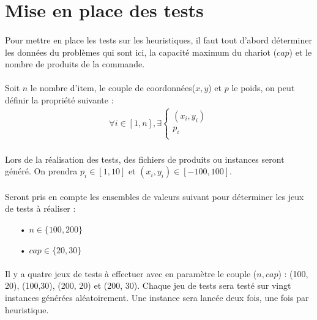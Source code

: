 \documentclass[twoside,UTF8]{EPURapport}
\begin{document}
\section{Mise en place des tests}

\paragraph{}
Pour mettre en place les tests sur les heuristiques, il faut tout d'abord déterminer les données du problèmes qui sont ici, la capacité maximum du chariot ($cap$) et le nombre de produits de la commande.

\paragraph{}
Soit $n$ le nombre d'item, le couple de coordonnées($x,y$) et $p$ le poids, on peut définir la propriété suivante : 
\begin{align}
\forall i\in [1,n], \exists
\left\{
  \begin{array}{rcr}
   (x_{i},y_{i}) \\
     p_{i} \\
  \end{array}
\right.
\end{align}

\paragraph{}
Lors de la réalisation des tests, des fichiers de produits ou instances seront généré. On prendra $p_{i}\in [1,10]$ et $(x_{i},y_{i}) \in [-100, 100]$.

\paragraph{}
Seront pris en compte les ensembles de valeurs suivant pour déterminer les jeux de tests à réaliser : 
\begin{itemize}
	\item[•]$n \in \{100, 200\}$
	\item[•]$cap \in \{20, 30\}$
\end{itemize} 

\paragraph{}
Il y a quatre jeux de tests à effectuer avec en paramètre le couple ($n, cap$) : (100, 20), (100,30), (200, 20) et (200, 30).
Chaque jeu de tests sera testé sur vingt instances générées aléatoirement. Une instance sera lancée deux fois, une fois par heuristique. 
\end{document}
